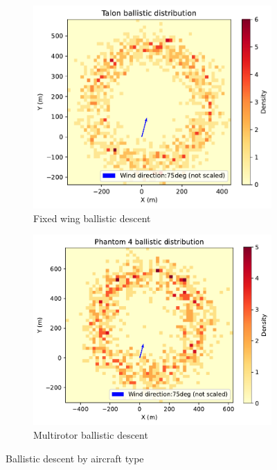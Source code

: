 \documentclass[12pt]{report}
\begin{document}
        \begin{figure}[H]
            \centering
            \begin{subfigure}[b]{0.45\textwidth}
                \centering
                \includegraphics[width=\textwidth]{Plot/talon/Talon ballistic distribution.pdf}
                \caption{Fixed wing ballistic descent}
                \label{fig:fixed_wing}
            \end{subfigure}
            \hfill
            \begin{subfigure}[b]{0.45\textwidth}
                \centering
                \includegraphics[width=\textwidth]{Plot/phantom4/Phantom 4 ballistic distribution.pdf}
                \caption{Multirotor ballistic descent}
                \label{fig:multirotor}
            \end{subfigure}
            \caption{Ballistic descent by aircraft type}
            \label{fig:ballistic_descent}
        \end{figure}
\end{document}
